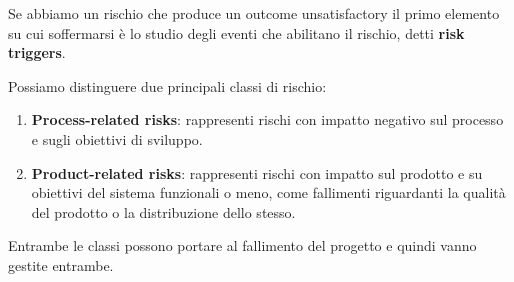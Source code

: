 Se abbiamo un rischio che produce un outcome unsatisfactory il primo elemento su
cui soffermarsi è lo studio degli eventi che abilitano il rischio, detti \textbf{risk triggers}.

Possiamo distinguere due principali classi di rischio:
\begin{enumerate}
    \item \textbf{Process-related risks}: rappresenti rischi con impatto
          negativo sul processo e sugli obiettivi di sviluppo.
    \item \textbf{Product-related risks}: rappresenti rischi con impatto sul
          prodotto e su obiettivi del sistema funzionali o meno, come fallimenti
          riguardanti la qualità del prodotto o la distribuzione dello stesso.
\end{enumerate}
Entrambe le classi possono portare al fallimento del progetto e quindi vanno gestite
entrambe.
